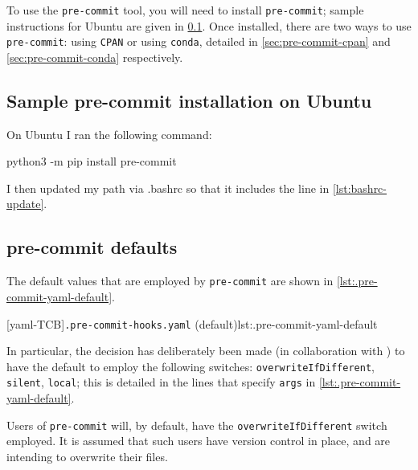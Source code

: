 \documentclass[10pt]{article}
\begin{document}
  To use the \texttt{pre-commit} tool, you will need to install \texttt{pre-commit};
  sample instructions for Ubuntu are given in \cref{sec:pre-commit-ubuntu}. Once
  installed, there are two ways to use \texttt{pre-commit}: using \texttt{CPAN} or using
  \texttt{conda}, detailed in \cref{sec:pre-commit-cpan} and \cref{sec:pre-commit-conda}
  respectively.

 \subsection{Sample pre-commit installation on Ubuntu}\label{sec:pre-commit-ubuntu}
  On Ubuntu I ran the following command:

  \begin{commandshell}
python3 -m pip install pre-commit
\end{commandshell}

  I then updated my path via .bashrc so that it includes the line in
  \cref{lst:bashrc-update}.

 \subsection{pre-commit defaults}
  The default values that are employed by \texttt{pre-commit} are shown in \cref{lst:.pre-commit-yaml-default}.

  [yaml-TCB]{\texttt{.pre-commit-hooks.yaml} (default)}{lst:.pre-commit-yaml-default}

  In particular, the decision has deliberately been made (in collaboration with
  \cite{holzhausprecommit}) to have the default to employ the following switches:
  \texttt{overwriteIfDifferent}, \texttt{silent}, \texttt{local}; this is detailed in the
  lines that specify \texttt{args} in \cref{lst:.pre-commit-yaml-default}.

  \begin{warning}
   Users of \texttt{pre-commit} will, by default, have the \texttt{overwriteIfDifferent}
   switch employed. It is assumed that such users have version control in place, and are
   intending to overwrite their files.
  \end{warning}
\end{document}
